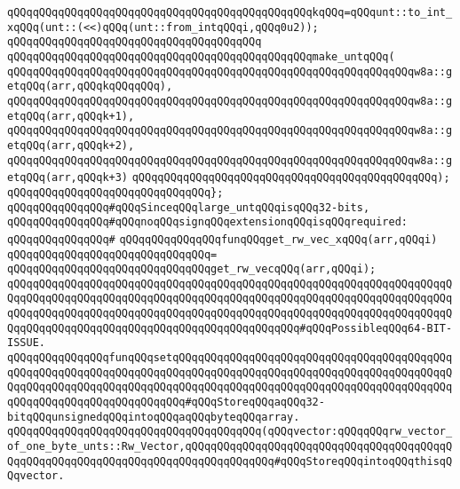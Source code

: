\newline
\verb|qQQqqQQqqQQqqQQqqQQqqQQqqQQqqQQqqQQqqQQqqQQqqQQqkqQQq=qQQqunt::to_int_xqQQq(unt::(<<)qQQq(unt::from_intqQQqi,qQQq0u2));|\newline
\verb|qQQqqQQqqQQqqQQqqQQqqQQqqQQqqQQqqQQqqQQq|\newline
\verb|qQQqqQQqqQQqqQQqqQQqqQQqqQQqqQQqqQQqqQQqqQQqqQQqmake_untqQQq(|\newline
\verb|qQQqqQQqqQQqqQQqqQQqqQQqqQQqqQQqqQQqqQQqqQQqqQQqqQQqqQQqqQQqqQQqw8a::getqQQq(arr,qQQqkqQQqqQQq),|\newline
\verb|qQQqqQQqqQQqqQQqqQQqqQQqqQQqqQQqqQQqqQQqqQQqqQQqqQQqqQQqqQQqqQQqw8a::getqQQq(arr,qQQqk+1),|\newline
\verb|qQQqqQQqqQQqqQQqqQQqqQQqqQQqqQQqqQQqqQQqqQQqqQQqqQQqqQQqqQQqqQQqw8a::getqQQq(arr,qQQqk+2),|\newline
\verb|qQQqqQQqqQQqqQQqqQQqqQQqqQQqqQQqqQQqqQQqqQQqqQQqqQQqqQQqqQQqqQQqw8a::getqQQq(arr,qQQqk+3)|\newline
\verb|qQQqqQQqqQQqqQQqqQQqqQQqqQQqqQQqqQQqqQQqqQQqqQQq);|\newline
\verb|qQQqqQQqqQQqqQQqqQQqqQQqqQQqqQQq};|\newline
\newline
\verb|qQQqqQQqqQQqqQQq#qQQqSinceqQQqlarge_untqQQqisqQQq32-bits,|\newline
\verb|qQQqqQQqqQQqqQQq#qQQqnoqQQqsignqQQqextensionqQQqisqQQqrequired:|\newline
\verb|qQQqqQQqqQQqqQQq#|\newline
\verb|qQQqqQQqqQQqqQQqfunqQQqget_rw_vec_xqQQq(arr,qQQqi)|\newline
\verb|qQQqqQQqqQQqqQQqqQQqqQQqqQQqqQQq=|\newline
\verb|qQQqqQQqqQQqqQQqqQQqqQQqqQQqqQQqget_rw_vecqQQq(arr,qQQqi);|\newline
\verb|qQQqqQQqqQQqqQQqqQQqqQQqqQQqqQQqqQQqqQQqqQQqqQQqqQQqqQQqqQQqqQQqqQQqqQQqqQQqqQQqqQQqqQQqqQQqqQQqqQQqqQQqqQQqqQQqqQQqqQQqqQQqqQQqqQQqqQQqqQQqqQQqqQQqqQQqqQQqqQQqqQQqqQQqqQQqqQQqqQQqqQQqqQQqqQQqqQQqqQQqqQQqqQQqqQQqqQQqqQQqqQQqqQQqqQQqqQQqqQQqqQQqqQQqqQQqqQQq#qQQqPossibleqQQq64-BIT-ISSUE.|\newline
\verb|qQQqqQQqqQQqqQQqfunqQQqsetqQQqqQQqqQQqqQQqqQQqqQQqqQQqqQQqqQQqqQQqqQQqqQQqqQQqqQQqqQQqqQQqqQQqqQQqqQQqqQQqqQQqqQQqqQQqqQQqqQQqqQQqqQQqqQQqqQQqqQQqqQQqqQQqqQQqqQQqqQQqqQQqqQQqqQQqqQQqqQQqqQQqqQQqqQQqqQQqqQQqqQQqqQQqqQQqqQQqqQQqqQQqqQQqqQQq#qQQqStoreqQQqaqQQq32-bitqQQqunsignedqQQqintoqQQqaqQQqbyteqQQqarray.|\newline
\verb|qQQqqQQqqQQqqQQqqQQqqQQqqQQqqQQqqQQqqQQq(qQQqvector:qQQqqQQqrw_vector_of_one_byte_unts::Rw_Vector,qQQqqQQqqQQqqQQqqQQqqQQqqQQqqQQqqQQqqQQqqQQqqQQqqQQqqQQqqQQqqQQqqQQqqQQqqQQqqQQqqQQq#qQQqStoreqQQqintoqQQqthisqQQqvector.|\newline
